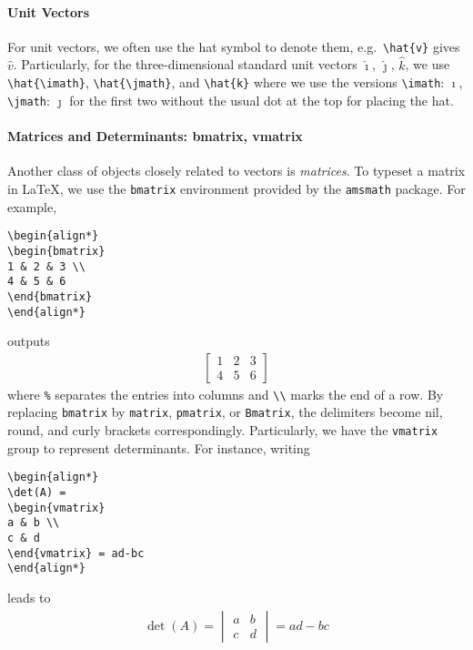 \paragraph{Unit Vectors}
For unit vectors, we often use the hat symbol to denote them, e.g.\ \texttt{\textbackslash hat\{v\}} gives $\hat{v}$. Particularly, for the three-dimensional standard unit vectors $\hat{\imath}$, $\hat{\jmath}$, $\hat{k}$, we use \texttt{\textbackslash hat\{\textbackslash imath\}}, \texttt{\textbackslash hat\{\textbackslash jmath\}}, and \texttt{\textbackslash hat\{k\}} where we use the versions \texttt{\textbackslash imath}: $\imath$, \texttt{\textbackslash jmath}: $\jmath$ for the first two without the usual dot at the top for placing the hat. 

\paragraph{Matrices and Determinants: bmatrix, vmatrix}
Another class of objects closely related to vectors is \textit{matrices}. To typeset a matrix in \LaTeX{}, we use the \texttt{bmatrix} environment provided by the \verb|amsmath| package. For example,
\begin{lstlisting}
\begin{align*}
\begin{bmatrix}
1 & 2 & 3 \\
4 & 5 & 6
\end{bmatrix}
\end{align*}    
\end{lstlisting}
outputs
\begin{align*}
\begin{bmatrix}
1 & 2 & 3 \\
4 & 5 & 6
\end{bmatrix}
\end{align*}
where \texttt{\%} separates the entries into columns and \texttt{\textbackslash\textbackslash} marks the end of a row. By replacing \texttt{bmatrix} by \texttt{matrix}, \texttt{pmatrix}, or \texttt{Bmatrix}, the delimiters become nil, round, and curly brackets correspondingly. Particularly, we have the \texttt{vmatrix} group to represent determinants. For instance, writing
\begin{lstlisting}
\begin{align*}
\det(A) =
\begin{vmatrix}
a & b \\
c & d
\end{vmatrix} = ad-bc
\end{align*}
\end{lstlisting}
leads to
\begin{align*}
\det(A) = 
\begin{vmatrix}
a & b \\
c & d
\end{vmatrix} = ad-bc
\end{align*}

